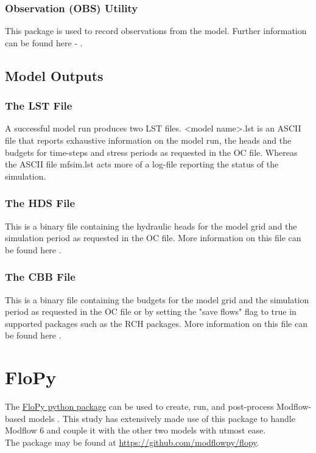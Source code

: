 \subsubsection*{Observation (OBS) Utility}
This package is used to record observations from the model.
Further information can be found here - \cite[p.~164]{USGS2018}.


\subsection{Model Outputs}
\subsubsection*{The LST File}
A successful model run produces two LST files. \textless model \textunderscore name\textgreater .lst is an ASCII file that reports exhaustive information on the model run, the heads and the budgets for time-steps and stress periods as requested in the OC file. Whereas the ASCII file mfsim.lst acts more of a log-file reporting the status of the simulation.

\subsubsection*{The HDS File}
This is a binary file containing the hydraulic heads for the model grid and the simulation period as requested in the OC file. More information on this file can be found here \cite[p.~239]{USGS2018}.

\subsubsection*{The CBB File}
This is a binary file containing the budgets for the model grid and the simulation period as requested in the OC file or by setting the "save flows" flag to true in supported packages such as the RCH packages. More information on this file can be found here \cite[p.~249]{USGS2018}.


\section*{FloPy}
The \href{https://github.com/modflowpy/flopy}{FloPy python package} can be used to create, run, and post-process Modflow-based models \cite{Bakker2016}. This study has extensively made use of this package to handle Modflow 6 and couple it with the other two models with utmost ease.
\\
The package may be found at \url{https://github.com/modflowpy/flopy}.


